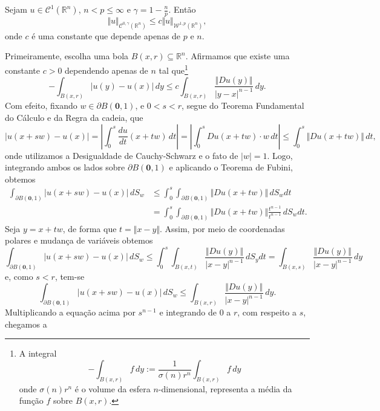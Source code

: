 \documentclass[a4paper, 11pt]{book}
\theoremstyle{definition}
\newcommand{\bR}{\mathbb{R}}
\newcommand{\bz}{\mathbf{0}}
\newcommand{\cC}{\mathcal{C}}
\newcommand{\cW}{\mathcal{W}}
\newcommand{\sint}{-\!\!\!\!\!\!\int}
\begin{document}
\begin{tbox} \label{thm:holdersobolev1}
    Sejam $u \in \cC^1(\bR^n)$, $n < p \leqslant \infty$ e $\gamma = 1 - \frac{n}{p}$. Então
    \[
        \Vert u \Vert_{\cC^{0,\gamma}(\bR^n)} \leqslant c \Vert u \Vert_{\cW^{1,p}(\bR^n)},
    \]
    onde $c$ é uma constante que depende apenas de $p$ e $n$.
\end{tbox}
\begin{prf}
    Primeiramente, escolha uma bola $B(x,r) \subseteq \bR^n$.
    Afirmamos que existe uma constante $c > 0$ dependendo apenas de $n$ tal que\footnote{A integral
    \[
        \sint_{B(x,r)} f\,dy := \frac{1}{\sigma(n)r^n}\int_{B(x,r)} f \,dy
    \]
    onde $\sigma(n)r^n$ é o volume da esfera $n$-dimensional, representa a média da função $f$ sobre $B(x,r)$.}
    \begin{equation} \label{eq:desigualdade-uyux}
        \sint_{B(x,r)} |u(y) - u(x)| \,dy \leqslant c \int_{B(x,r)} \frac{\Vert Du(y) \Vert}{|y-x|^{n-1}} \,dy.
    \end{equation}
    Com efeito, fixando $w \in \partial B(\bz,1)$, e $0 < s < r$, segue do Teorema Fundamental do Cálculo e da Regra da cadeia, que
    \[
        |u(x + sw) - u(x)| = \left| \int_0^s \frac{du}{dt} (x + tw) \,dt \right| = \left|\int_0^s Du(x + tw) \cdot w \,dt \right| \leqslant \int_0^s \Vert Du(x + tw) \Vert \,dt,
    \]
    onde utilizamos a Desigualdade de Cauchy-Schwarz e o fato de $|w| = 1$. Logo, integrando ambos os lados sobre $\partial B(\bz,1)$ e aplicando o Teorema de Fubini, obtemos
    \[
        \begin{aligned}
            \int_{\partial B(\bz,1)} |u(x + sw) - u(x)|\,dS_w &\leqslant  \int_0^s \int_{\partial B(\bz,1)} \Vert Du(x + tw) \Vert \,dS_wdt\\ 
            &= \int_0^s \int_{\partial B(\bz,1)} \Vert Du(x + tw) \Vert \frac{t^{n-1}}{t^{n-1}} \,dS_wdt.
        \end{aligned}
    \]
    Seja $y = x + tw$, de forma que $t = \Vert x - y \Vert$. Assim, por meio de coordenadas polares e mudança de variáveis obtemos
    \[
        \int_{\partial B(\bz,1)} |u(x + sw) - u(x)|\,dS_w \leqslant \int_0^s \int_{B(x,t)} \frac{\Vert Du(y) \Vert}{|x-y|^{n-1}} \,dS_ydt =  \int_{B(x,s)} \frac{\Vert Du(y) \Vert}{|x-y|^{n-1}} \,dy
    \]
    e, como $s < r$, tem-se
    \[
        \int_{\partial B(\bz,1)} |u(x + sw) - u(x)|\,dS_w \leqslant   \int_{B(x,r)} \frac{\Vert Du(y) \Vert}{|x-y|^{n-1}} \,dy.
    \]
    Multiplicando a equação acima por $s^{n-1}$ e integrando de $0$ a $r$, com respeito a $s$, chegamos a

\end{prf}
\end{document}
